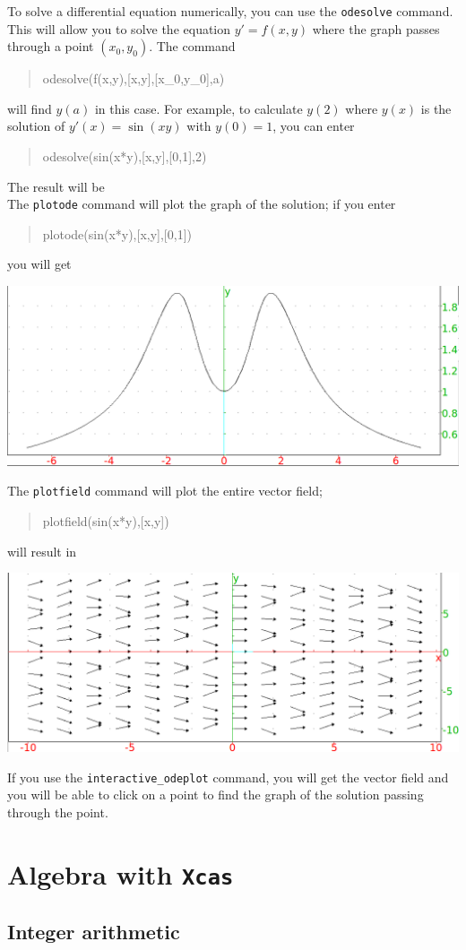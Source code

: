 \documentclass{article}
\newcommand{\xcasin}[1]
{\begin{quote}\ttfamily
#1
\end{quote}}
\newcommand{\xcasout}[1]
{\begin{equation*}
#1
\end{equation*}}
\begin{document}
To solve a differential equation numerically, you can use the
\texttt{odesolve} command.  This will allow you to solve the equation
$y'=f(x,y)$ where the graph passes through a point $(x_0,y_0)$.  The
command
\xcasin{odesolve(f(x,y),[x,y],[x\_0,y\_0],a)}
will find $y(a)$ in this case.  For example, to calculate $y(2)$ where
$y(x)$ is the solution of $y'(x) =\sin(xy)$ with $y(0)=1$, you can
enter
\xcasin{odesolve(sin(x*y),[x,y],[0,1],2)}
The result will be 
\xcasout{[1.82241255674]}
The \texttt{plotode} command will plot the graph of the solution; if
you enter
\xcasin{plotode(sin(x*y),[x,y],[0,1])}
you will get
\begin{center}
\includegraphics[width=\textwidth]{xcas-plotode.png}
\end{center}
The \texttt{plotfield} command will plot the entire vector field;
\xcasin{plotfield(sin(x*y),[x,y])}
will result in
\begin{center}
\includegraphics[width=\textwidth]{xcas-plotfield.png}
\end{center}
If you use the \texttt{interactive\_odeplot} command, you will get the
vector field and you will be able to click on a point to find the
graph of the solution passing through the point.


\section{Algebra with \texttt{Xcas}}

\subsection{Integer arithmetic}
\end{document}
